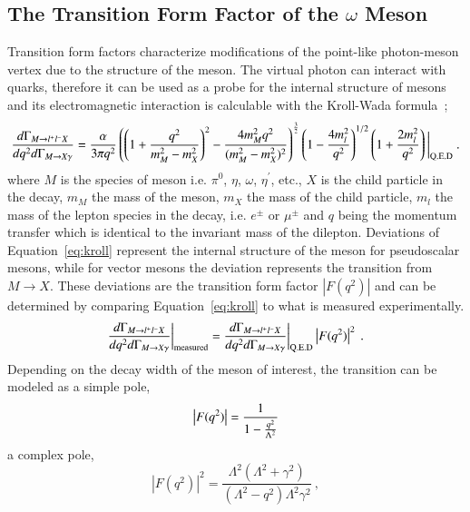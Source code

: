 \documentclass[epj]{webofc}
\begin{document}
\subsection{The Transition Form Factor  of the $\omega$ Meson}
Transition form factors characterize modifications of the point-like photon-meson vertex due to the structure of the meson. The virtual photon can interact with quarks, therefore it can be used as a probe for the internal structure of mesons and its electromagnetic interaction is calculable with the Kroll-Wada formula~\cite{bib4};
\begin{equation}
\frac{d\Gamma_{M{\rightarrow l^{+}l^{-}X}}}{dq^{2} d\Gamma_{M{\rightarrow X\gamma}}} = \frac{\alpha}{3\pi q^{2}}\left(\left(1+\frac{q^{2}}{m^{2}_{M}-m^{2}_{X}}\right)^2 - \frac{4m^{2}_{M}q^2}{(m^{2}_{M}-m^{2}_{X})^2}\right)^\frac{3}{2}\left(1-\frac{4m_{l}^{2}}{q^{2}}\right)^{1/2}\left(1+\frac{2m_{l}^{2}}{q^{2}}\right) \bigg|_{\mathrm{Q.E.D}}  \label{eq:kroll} \ . \\
\end{equation}
 where $M$ is the species of meson i.e. $\pi^0$, $\eta$, $\omega$, $\eta^{\prime}$, etc., $X$ is the child particle in the decay, $m_M$ the mass of the meson, $m_X$ the mass of the child particle, $m_l$ the mass of the lepton species in the decay, i.e. $e^{\pm}$ or $\mu^{\pm}$ and $q$ being the momentum transfer which is identical to the invariant mass of the dilepton. Deviations of Equation~\ref{eq:kroll} represent the internal structure of the meson for pseudoscalar mesons, while for vector mesons the deviation represents the transition from $M \to X$. These deviations are the transition form factor $\left| F(q^2)\right|$ and can be determined by comparing Equation~\ref{eq:kroll} to what is measured experimentally.
 \begin{equation}
 \frac{d\Gamma_{M{\rightarrow l^{+}l^{-}X}}}{dq^{2} d\Gamma_{M{\rightarrow X\gamma}}}\bigg|_{\mathrm{measured}} =   \frac{d\Gamma_{M{\rightarrow l^{+}l^{-}X}}}{dq^{2} d\Gamma_{M{\rightarrow X\gamma}}} \bigg|_{\mathrm{Q.E.D}} \left| F(q^2)\right|^2 \label{eq:kroll_ff} \ . \\
 \end{equation}
 Depending on the decay width of the meson of interest, the transition can be modeled as a simple pole,
  \begin{equation}
  \left| F(q^2)\right| = \frac{1}{1-\frac{q^2}{\Lambda^2}} \label{eq:pole} \\
  \end{equation} 
 a complex pole,
 \begin{equation}
\left| F(q^2)\right|^2 = \frac{\Lambda^2(\Lambda^2 + \gamma^2)}{(\Lambda^2 - q^2)\Lambda^2 \gamma^2} \label{eq:cpole} \ ,
 \end{equation} 
\end{document}
